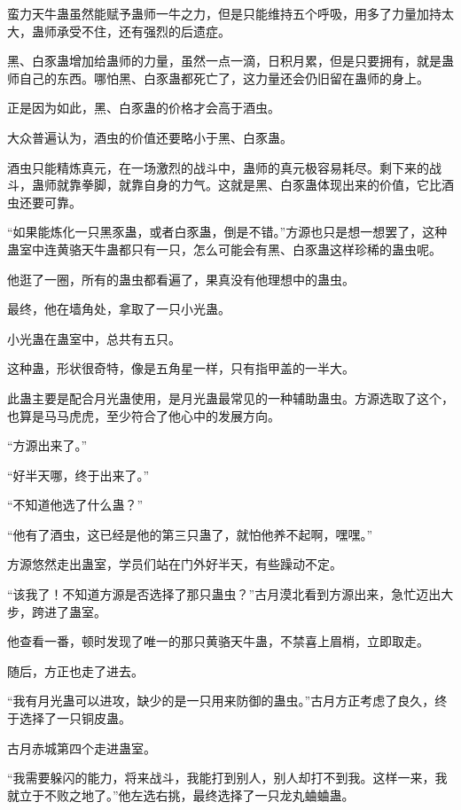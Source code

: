 \begin{this_body}
蛮力天牛蛊虽然能赋予蛊师一牛之力，但是只能维持五个呼吸，用多了力量加持太大，蛊师承受不住，还有强烈的后遗症。

黑、白豕蛊增加给蛊师的力量，虽然一点一滴，日积月累，但是只要拥有，就是蛊师自己的东西。哪怕黑、白豕蛊都死亡了，这力量还会仍旧留在蛊师的身上。

正是因为如此，黑、白豕蛊的价格才会高于酒虫。

大众普遍认为，酒虫的价值还要略小于黑、白豕蛊。

酒虫只能精炼真元，在一场激烈的战斗中，蛊师的真元极容易耗尽。剩下来的战斗，蛊师就靠拳脚，就靠自身的力气。这就是黑、白豕蛊体现出来的价值，它比酒虫还要可靠。

“如果能炼化一只黑豕蛊，或者白豕蛊，倒是不错。”方源也只是想一想罢了，这种蛊室中连黄骆天牛蛊都只有一只，怎么可能会有黑、白豕蛊这样珍稀的蛊虫呢。

他逛了一圈，所有的蛊虫都看遍了，果真没有他理想中的蛊虫。

最终，他在墙角处，拿取了一只小光蛊。

小光蛊在蛊室中，总共有五只。

这种蛊，形状很奇特，像是五角星一样，只有指甲盖的一半大。

此蛊主要是配合月光蛊使用，是月光蛊最常见的一种辅助蛊虫。方源选取了这个，也算是马马虎虎，至少符合了他心中的发展方向。

“方源出来了。”

“好半天哪，终于出来了。”

“不知道他选了什么蛊？”

“他有了酒虫，这已经是他的第三只蛊了，就怕他养不起啊，嘿嘿。”

方源悠然走出蛊室，学员们站在门外好半天，有些躁动不定。

“该我了！不知道方源是否选择了那只蛊虫？”古月漠北看到方源出来，急忙迈出大步，跨进了蛊室。

他查看一番，顿时发现了唯一的那只黄骆天牛蛊，不禁喜上眉梢，立即取走。

随后，方正也走了进去。

“我有月光蛊可以进攻，缺少的是一只用来防御的蛊虫。”古月方正考虑了良久，终于选择了一只铜皮蛊。

古月赤城第四个走进蛊室。

“我需要躲闪的能力，将来战斗，我能打到别人，别人却打不到我。这样一来，我就立于不败之地了。”他左选右挑，最终选择了一只龙丸蛐蛐蛊。

\end{this_body}

